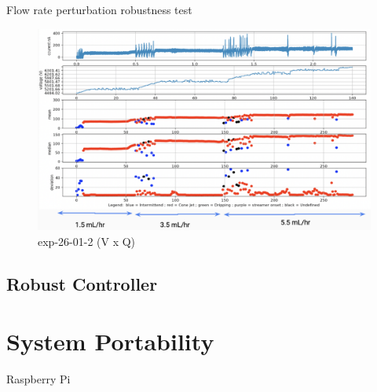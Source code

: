         Flow rate perturbation robustness test

        \begin{figure}[H]
            \center
            \includegraphics[width=15cm]{Figuras/19:03/control_first_results.png}
            \caption{ exp-26-01-2 (V x Q)}
        \end{figure}


    \subsection{Robust Controller}

    


    \section{System Portability}
    \label{sec:portability}
    
        Raspberry Pi


\clearpage